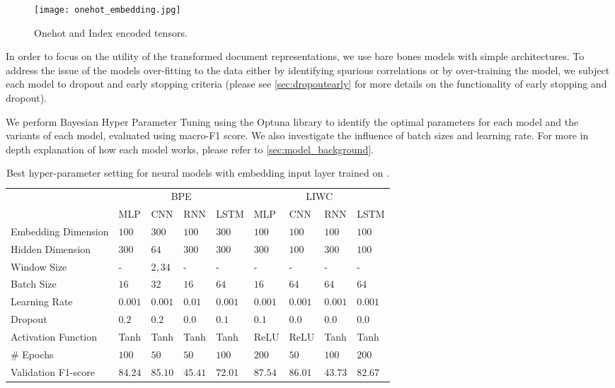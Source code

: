\begin{figure}
  \centering
  \texttt{[image: onehot\_embedding.jpg]}
  \caption{Onehot and Index encoded tensors.}
  \label{fig:onehot_embedding}
\end{figure}

In order to focus on the utility of the transformed document representations, we use bare bones models with simple architectures. To address the issue of the models over-fitting to the data either by identifying spurious correlations or by over-training the model, we subject each model to dropout and early stopping criteria (please see \autoref{sec:dropoutearly} for more details on the functionality of early stopping and dropout).

We perform Bayesian Hyper Parameter Tuning using the Optuna library \cite{Optuna:2019} to identify the optimal parameters for each model and the variants of each model, evaluated using macro-F1 score. We also investigate the influence of batch sizes and learning rate. For more in depth explanation of how each model works, please refer to \autoref{sec:model_background}.\vspace{5mm}

\begin{landscape}
\begin{table}[]
\centering
\begin{tabular}{lllllllll}
                      & \multicolumn{4}{c}{BPE}                 & \multicolumn{4}{c|}{LIWC} \\
                       & MLP     & CNN      & RNN     & LSTM    & MLP     & CNN     & RNN     & LSTM     \\ \hline
Embedding Dimension    & $100$   & $300$    & $100$   & $300$   & $100$   & $100$   & $100$   & $100$    \\
Hidden Dimension       & $300$   & $64$     & $300$   & $300$   & $300$   & $100$   & $300$   & $100$    \\
Window Size            & -       & $2, 3 4$ & -       & -       & -       & -       & -       & -        \\
Batch Size             & $16$    & $32$     & $16$    & $64$    & $16$    & $64$    & $64$    & $64$     \\
Learning Rate          & $0.001$ & $0.001$  & $0.01$  & $0.001$ & $0.001$ & $0.001$ & $0.001$ & $0.001$  \\
Dropout                & $0.2$   & $0.2$    & $0.0$   & $0.1$   & $0.1$   & $0.0$   & $0.0$   & $0.0$    \\
Activation Function    & Tanh    & Tanh     & Tanh    & Tanh    & ReLU    & ReLU    & Tanh    & Tanh     \\
# Epochs               & $100$   & $50$     & $50$    & $100$   & $200$   & $50$    & $100$   & $200$    \\
Validation F1-score    & $84.24$ & $85.10$  & $45.41$ & $72.01$ & $87.54$ & $86.01$ & $43.73$ & $82.67$  
\end{tabular}
\caption{Best hyper-parameter setting for neural models with embedding input layer trained on \citet{Davidson:2017}.}
\label{tab:redux_hyperparam_search_davidson}
\end{table}
\end{landscape}


